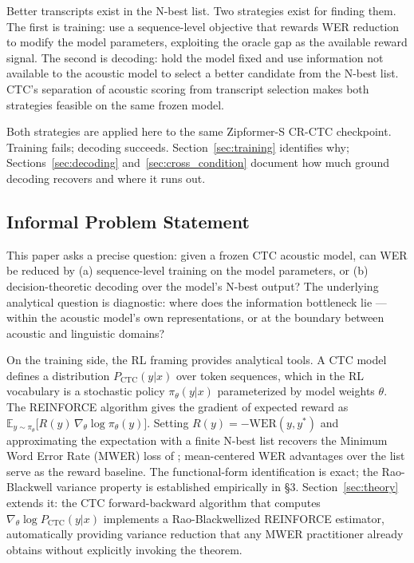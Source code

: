 Better transcripts exist in the N-best list. Two strategies exist for finding them. The first is training: use a sequence-level objective that rewards WER reduction to modify the model parameters, exploiting the oracle gap as the available reward signal. The second is decoding: hold the model fixed and use information not available to the acoustic model to select a better candidate from the N-best list. CTC's separation of acoustic scoring from transcript selection makes both strategies feasible on the same frozen model.

Both strategies are applied here to the same Zipformer-S CR-CTC checkpoint. Training fails; decoding succeeds. Section~\ref{sec:training} identifies why; Sections~\ref{sec:decoding} and~\ref{sec:cross_condition} document how much ground decoding recovers and where it runs out.



\subsection{Informal Problem Statement}

This paper asks a precise question: given a frozen CTC acoustic model, can WER be reduced by (a) sequence-level training on the model parameters, or (b) decision-theoretic decoding over the model's N-best output? The underlying analytical question is diagnostic: where does the information bottleneck lie — within the acoustic model's own representations, or at the boundary between acoustic and linguistic domains?

On the training side, the RL framing provides analytical tools. A CTC model defines a distribution $P_\text{CTC}(y|x)$ over token sequences, which in the RL vocabulary is a stochastic policy $\pi_\theta(y|x)$ parameterized by model weights $\theta$. The REINFORCE algorithm \cite{williams1992} gives the gradient of expected reward as $\mathbb{E}_{y \sim \pi_\theta}\bigl[R(y)\,\nabla_\theta \log \pi_\theta(y)\bigr]$. Setting $R(y) = -\text{WER}(y, y^*)$ and approximating the expectation with a finite N-best list recovers the Minimum Word Error Rate (MWER) loss of \citet{prabhavalkar2018mwer}; mean-centered WER advantages over the list serve as the reward baseline. The functional-form identification is exact; the Rao-Blackwell variance property is established empirically in §3. Section~\ref{sec:theory} extends it: the CTC forward-backward algorithm that computes $\nabla_\theta \log P_\text{CTC}(y|x)$ implements a Rao-Blackwellized REINFORCE estimator, automatically providing variance reduction that any MWER practitioner already obtains without explicitly invoking the theorem.


